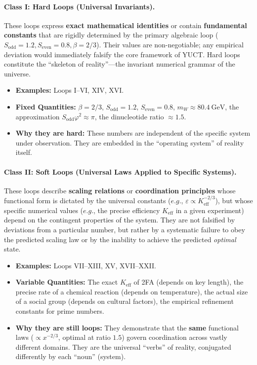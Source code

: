 \documentclass[12pt,a4paper]{article}
\begin{document}
	\paragraph{Class I: Hard Loops (Universal Invariants).}
	These loops express \textbf{exact mathematical identities} or contain \textbf{fundamental constants} that are rigidly determined by the primary algebraic loop (\(S_{\mathrm{odd}}=1.2, S_{\mathrm{even}}=0.8, \beta=2/3\)). Their values are non-negotiable; any empirical deviation would immediately falsify the core framework of YUCT. Hard loops constitute the ``skeleton of reality''—the invariant numerical grammar of the universe.
	\begin{itemize}
		\item \textbf{Examples:} Loops I--VI, XIV, XVI.
		\item \textbf{Fixed Quantities:} \(\beta = 2/3\), \(S_{\mathrm{odd}}=1.2\), \(S_{\mathrm{even}}=0.8\), \(m_W \approx 80.4\ \text{GeV}\), the approximation \(S_{\mathrm{odd}}\varphi^2 \approx \pi\), the dinucleotide ratio \(\approx 1.5\).
		\item \textbf{Why they are hard:} These numbers are independent of the specific system under observation. They are embedded in the ``operating system'' of reality itself.
	\end{itemize}
	
	\paragraph{Class II: Soft Loops (Universal Laws Applied to Specific Systems).}
	These loops describe \textbf{scaling relations} or \textbf{coordination principles} whose functional form is dictated by the universal constants (\(e.g.\), \(\varepsilon \propto K_{\mathrm{eff}}^{-2/3}\)), but whose specific numerical values (\(e.g.\), the precise efficiency \(K_{\mathrm{eff}}\) in a given experiment) depend on the contingent properties of the system. They are not falsified by deviations from a particular number, but rather by a systematic failure to obey the predicted scaling law or by the inability to achieve the predicted \textit{optimal} state.
	\begin{itemize}
		\item \textbf{Examples:} Loops VII--XIII, XV, XVII--XXII.
		\item \textbf{Variable Quantities:} The exact \(K_{\mathrm{eff}}\) of 2FA (depends on key length), the precise rate of a chemical reaction (depends on temperature), the actual size of a social group (depends on cultural factors), the empirical refinement constants for prime numbers.
		\item \textbf{Why they are still loops:} They demonstrate that the \textbf{same} functional laws (\(\propto x^{-2/3}\), optimal at ratio \(1.5\)) govern coordination across vastly different domains. They are the universal ``verbs'' of reality, conjugated differently by each ``noun'' (system).
	\end{itemize}
	
\end{document}
